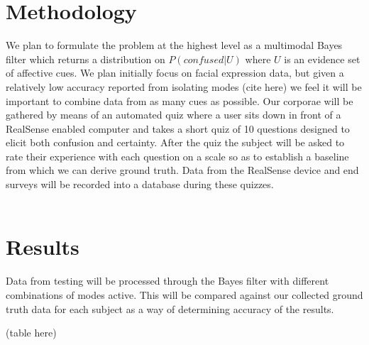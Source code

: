 \documentclass[12pt,letterpaper]{article}
\begin{document}

\section{Methodology}
We plan to formulate the problem at the highest level as a multimodal Bayes filter which returns a distribution on $P(confused | U)$ where $U$ is an evidence set of affective cues.  We plan initially focus on facial expression data, but given a relatively low accuracy reported from isolating modes (cite here) we feel it will be important to combine data from as many cues as possible.  Our corporae will be gathered by means of an automated quiz where a user sits down in front of a RealSense enabled computer and takes a short quiz of 10 questions designed to elicit both confusion and certainty.  After the quiz the subject will be asked to rate their experience with each question on a scale so as to establish a baseline from which we can derive ground truth.  Data from the RealSense device and end surveys will be recorded into a database during these quizzes.\\ \\

\section{Results}
Data from testing will be processed through the Bayes filter with different combinations of modes active.  This will be compared against our collected ground truth data for each subject as a way of determining accuracy of the results.

(table here)

\end{document}
